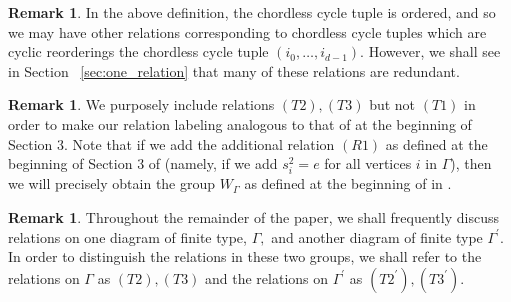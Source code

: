 \documentclass[11pt]{amsart}
\theoremstyle{definition}
\newtheorem{rem}[thm]{Remark}
\begin{document}
\begin{rem}
In the above definition, the chordless cycle tuple is ordered, and so we may have other relations corresponding to chordless cycle tuples which are cyclic reorderings the chordless cycle tuple $(i_0,\ldots, i_{d-1}).$ However, we shall see in Section ~\ref{sec:one_relation} that many of these relations are redundant.
\end{rem}

\begin{rem}
We purposely include relations $(T2),(T3)$ but not $(T1)$ in order to make our relation labeling analogous to that of \cite{BM13} at the beginning of Section 3. Note that if we add the additional relation $(R1)$ as defined at the beginning of Section 3 of \cite{BM13} (namely, if we add $s_i^2 = e$ for all vertices $i$ in $\Gamma$), then we will precisely obtain the group $W_\Gamma$ as defined at the beginning of in \cite[Remark 3]{BM13}.
\end{rem}

\begin{rem}
Throughout the remainder of the paper, we shall frequently discuss relations on one diagram of finite type, $\Gamma,$ and another diagram of finite type $\Gamma^\prime.$ In order to distinguish the relations in these two groups, we shall refer to the relations on $\Gamma$ as $(T2),(T3)$ and the relations on $\Gamma^\prime$ as $(T2^\prime),(T3^\prime).$
\end{rem}
\end{document}
